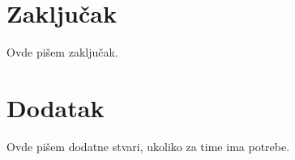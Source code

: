 \documentclass[a4paper]{article}
\begin{document}
\section{Zaključak}
\label{sec:zakljucak}

Ovde pišem zaključak. 


\appendix
 


\appendix
\section{Dodatak}
Ovde pišem dodatne stvari, ukoliko za time ima potrebe.
\end{document}
